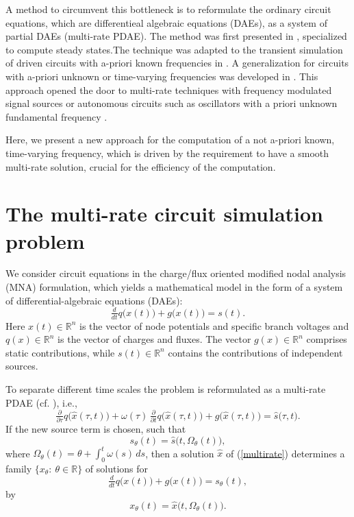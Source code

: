\documentclass{siamltex}
\begin{document}
A method to circumvent
this bottleneck is to reformulate the ordinary circuit {{{equations, which are differentieal algebraic equations (DAEs),}}} 
as a system of partial DAEs (multi-rate PDAE).
The method was first presented in \cite{Bra94,BWL+96}, specialized to compute steady states.The technique was adapted
to the transient simulation of
driven circuits with a-priori known frequencies in \cite{NL96,Roy97}. 
A generalization
for circuits with a-priori unknown or 
time-varying frequencies was developed in
\cite{Bra97,BL98a,Bra2001}. This approach opened the door
to multi-rate techniques with frequency modulated signal sources
or autonomous circuits such as oscillators with a priori unknown fundamental
frequency \cite{BL98a,BL98,Bra2001,Hou04,Pulch08a,Pulch08b}.

Here, we present a new approach for the computation of a not a-priori known, time-varying 
frequency, which
is driven by the requirement to have a smooth multi-rate solution, crucial for the efficiency 
of the computation. 

\section{The multi-rate circuit simulation problem\label{MULTI_RATE}}

We consider circuit equations in the charge/flux oriented
modified nodal analysis (MNA) formulation, which yields a mathematical model
in the form of a system of differential-algebraic equations
(DAEs):
\begin{equation}
  \label{eq_MNA_charge}
  \tfrac{d}{dt}q\big(x(t)\big)
        + g\big(x(t)\big) = s(t).
\end{equation}
Here $x(t)\in{\mathbb{R}}^n$ is the vector of node potentials and specific branch
voltages and $q(x)\in{\mathbb{R}}^n$ is the vector of charges and fluxes. The vector
$g(x)\in{\mathbb{R}}^n$ comprises static contributions, while $s(t)\in{\mathbb{R}}^n$ contains the
contributions of independent sources.

To separate different time scales the problem is
reformulated as a multi-rate PDAE (cf. \cite{Bra2001,Hou04,Pulch08b,Pulch08a}), i.e.,
\begin{equation}\label{multirate}
\tfrac{\partial}{\partial \tau} q\big(\hat{x}(\tau,t)\big)
+\omega(\tau)\,\tfrac{\partial}{\partial t} q\big(\hat{x}(\tau,t)\big)
+g\big(\hat{x}(\tau,t)\big)=\hat{s}\big(\tau,t\big).
\end{equation}
If the new source term is chosen, such that
\begin{equation}\label{char_source}
s_\theta(t) = \hat{s}\big(t,\Omega_\theta(t)\big),
\end{equation}
where $\Omega_\theta(t)=\theta+\int_0^t \omega(s)\,ds$,
then a solution $\hat{x}$ of (\ref{multirate}) determines a family
$\{x_\theta:~\theta\in{\mathbb{R}}\}$ of solutions for
\begin{equation}
  \label{singlerate}
  \tfrac{d}{dt}q\big(x(t)\big)
        + g\big(x(t)\big) = s_\theta(t),
\end{equation}
by
\begin{equation}\label{character}
x_\theta(t) = \hat{x}\big(t,\Omega_\theta(t)\big).
\end{equation}
\end{document}
